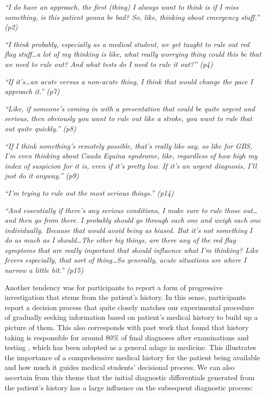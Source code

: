 \documentclass[a4paper, nobind]{templates/ociamthesis}
\begin{document}
\emph{``I do have an approach, the first (thing) I always want to think is if I miss something, is this patient gonna be bad? So, like, thinking about emergency stuff.'' (p2)}

\emph{``I think probably, especially as a medical student, we get taught to rule out red flag stuff\ldots a lot of my thinking is like, what really worrying thing could this be that we need to rule out? And what tests do I need to rule it out?'' (p4)}

\emph{``If it's\ldots an acute versus a non-acute thing, I think that would change the pace I approach it.'' (p7)}

\emph{``Like, if someone's coming in with a presentation that could be quite urgent and serious, then obviously you want to rule out like a stroke, you want to rule that out quite quickly.'' (p8)}

\emph{``If I think something's remotely possible, that's really like say, so like for GBS, I'm even thinking about Cauda Equina syndrome, like, regardless of how high my index of suspicion for it is, even if it's pretty low. If it's an urgent diagnosis, I'll just do it anyway.'' (p9)}

\emph{``I'm trying to rule out the most serious things.'' (p14)}

\emph{``And essentially if there's any serious conditions, I make sure to rule those out\ldots and then go from there. I probably should go through each one and weigh each one individually. Because that would avoid being as biased. But it's not something I do as much as I should\ldots The other big things, are there any of the red flag symptoms that are really important that should influence what I'm thinking? Like fevers especially, that sort of thing\ldots So generally, acute situations are where I narrow a little bit.'' (p15)}

\hfill\break
Another tendency was for participants to report a form of progressive investigation that stems from the patient's history. In this sense, participants report a decision process that quite closely matches our experimental procedure of gradually seeking information based on patient's medical history to build up a picture of them. This also corresponds with past work that found that history taking is responsible for around 80\% of final diagnoses after examinations and testing \autocite{hampton_relative_1975,sandler_importance_1980,peterson_contributions_1992}, which has been adopted as a general adage in medicine. This illustrates the importance of a comprehensive medical history for the patient being available and how much it guides medical students' decisional process. We can also ascertain from this theme that the initial diagnostic differentials generated from the patient's history has a large influence on the subsequent diagnostic process:\\
\end{document}
